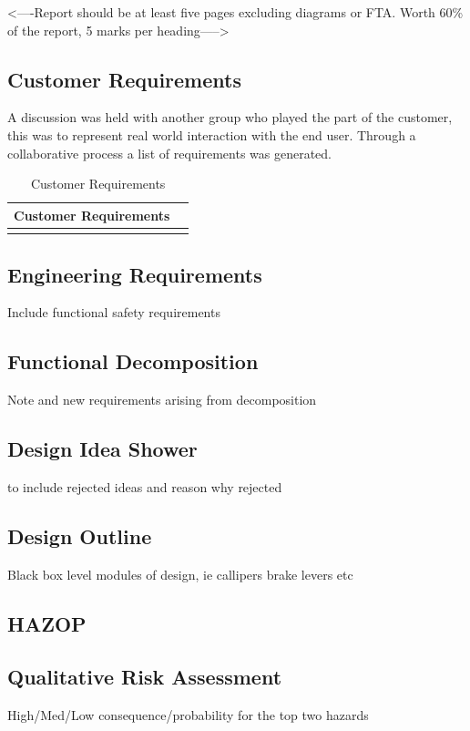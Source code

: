 \documentclass[12pt,a4paper]{article}
\begin{document}
<----Report should be at least five pages excluding diagrams or FTA. Worth 60\% of the report, 5 marks per heading----->

\subsection{Customer Requirements}
A discussion was held with another group who played the part of the customer, this was to represent real world interaction with the end user. Through a collaborative process a list of requirements was generated.
\begin{table}[H]
\label{tab:win}
	\begin{center}
	\begin{tabular}{p{}|p{}}
\toprule 
{\bf Customer Requirements} & {\bf }\\
\midrule
 & \\

\bottomrule
	\end{tabular}
\end{center}
\caption{Customer Requirements}
\end{table}
\subsection{Engineering Requirements}
Include functional safety requirements
\subsection{Functional Decomposition}
Note and new requirements arising from decomposition
\subsection{Design Idea Shower}
to include rejected ideas and reason why rejected
\subsection{Design Outline}
Black box level modules of design, ie callipers brake levers etc
\subsection{HAZOP}
\subsection{Qualitative Risk Assessment}
High/Med/Low consequence/probability for the top two hazards
\end{document}
